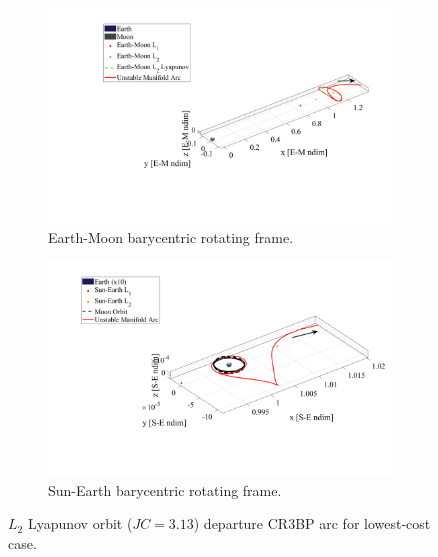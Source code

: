 \begin{figure}[H]
    \begin{subfigure}[h]{0.495\linewidth}
        \includegraphics[width=\textwidth]{figures/BestEM.pdf}
        \caption{Earth-Moon barycentric rotating frame.}
    \end{subfigure}
    \hfill
    \begin{subfigure}[h]{0.495\linewidth}
        \includegraphics[width=\textwidth]{figures/BestSE.pdf}
        \caption{Sun-Earth barycentric rotating frame.}
    \end{subfigure}
    \caption{$L_{2}$ Lyapunov orbit ($JC=3.13$) departure CR3BP arc for lowest-cost case.}
    \label{fig:bestE}
\end{figure}
